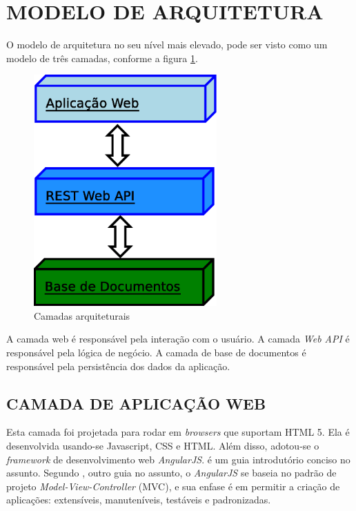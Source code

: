 \section[MODELO DE ARQUITETURA]{MODELO DE ARQUITETURA}

O modelo de arquitetura no seu nível mais elevado, pode ser visto como um modelo de três camadas, conforme a figura \ref{camadas_arquitetura}.
\begin{figure}[ht]
	\centering
	\includegraphics[width=7cm]{figuras/camadas.eps}
	\caption{Camadas arquiteturais}
	\label{camadas_arquitetura}
\end{figure}

A camada web é responsável pela interação com o usuário. 
A camada \emph{Web API} é responsável pela lógica de negócio. 
A camada de base de documentos é responsável pela persistência dos dados da aplicação.


\subsection[CAMADA DE APLICAÇÃO WEB] {CAMADA DE APLICAÇÃO WEB}
Esta camada foi projetada para rodar em \emph{browsers} que suportam HTML 5. 
Ela é desenvolvida usando-se Javascript, CSS e HTML. Além disso, adotou-se o \emph{framework} de desenvolvimento web \emph{AngularJS}. \cite{Branas2014} é um guia introdutório conciso no assunto. 
Segundo \cite{Freeman2014}, outro guia no assunto, o \emph{AngularJS} se baseia no padrão de projeto \emph{Model-View-Controller} (MVC), e sua enfase é em permitir a criação de aplicações: extensíveis, manuteníveis, testáveis e padronizadas.

